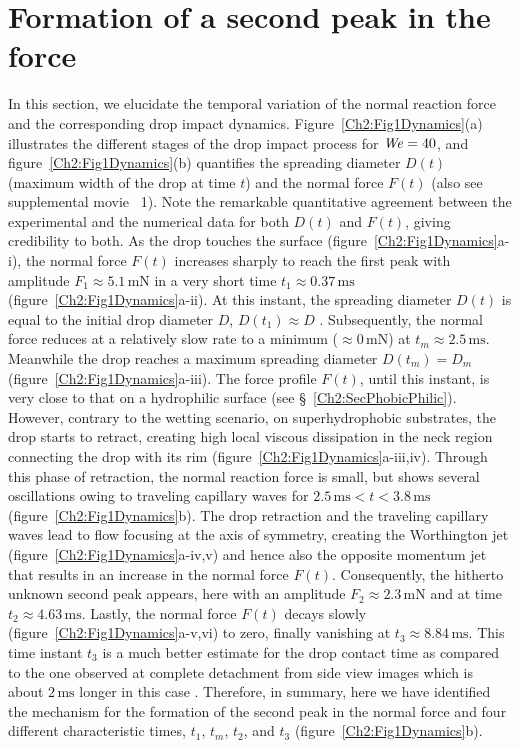 \section{Formation of a second peak in the force}\label{Ch2:SecForceTime}

In this section, we elucidate the temporal variation of the normal reaction force and the corresponding drop impact dynamics. Figure~\ref{Ch2:Fig1Dynamics}(a) illustrates the different stages of the drop impact process for $\mathit{We} = 40$, and figure~\ref{Ch2:Fig1Dynamics}(b) quantifies the spreading diameter $D(t)$ (maximum width of the drop at time $t$) and the normal force $F(t)$ (also see supplemental movie~{\color{Myfig} 1}). Note the remarkable quantitative agreement between the experimental and the numerical data for both $D(t)$ and $F(t)$, giving credibility to both. As the drop touches the surface (figure~\ref{Ch2:Fig1Dynamics}a-i), the normal force $F(t)$ increases sharply to reach the first peak with amplitude $F_1 \approx 5.1\,\si{\milli\newton}$ in a very short time $t_1 \approx 0.37\,\si{\milli\second}$ (figure~\ref{Ch2:Fig1Dynamics}a-ii). At this instant, the spreading diameter $D(t)$ is equal to the initial drop diameter $D$, $D (t_1) \approx D$ \cite{philippi2016, zhang2017, Gordillo2018, mitchell2019, zhang2019}. Subsequently, the normal force reduces at a relatively slow rate to a minimum ($\approx 0\,\si{\milli\newton}$) at $t_m \approx 2.5\,\si{\milli\second}$. Meanwhile the drop reaches a maximum spreading diameter $D(t_m) = D_{m}$  (figure~\ref{Ch2:Fig1Dynamics}a-iii). The force profile $F(t)$, until this instant, is very close to that on a hydrophilic surface (see \S~\ref{Ch2:SecPhobicPhilic}). However, contrary to the wetting scenario, on superhydrophobic substrates, the drop starts to retract, creating high local viscous dissipation in the neck region connecting the drop with its rim (figure~\ref{Ch2:Fig1Dynamics}a-iii,iv). Through this phase of retraction, the normal reaction force is small, but shows several oscillations owing to traveling capillary waves for $2.5\,\si{\milli\second} < t < 3.8\,\si{\milli\second}$ (figure~\ref{Ch2:Fig1Dynamics}b).  The drop retraction and the traveling capillary waves lead to flow focusing at the axis of symmetry, creating the Worthington jet (figure~\ref{Ch2:Fig1Dynamics}a-iv,v) and hence also the opposite momentum jet that results in an increase in the normal force $F(t)$. Consequently, the hitherto unknown second peak appears, here with an amplitude $F_2 \approx 2.3\,\si{\milli\newton}$ and at time $t_2 \approx 4.63\,\si{\milli\second}$. Lastly, the normal force $F(t)$ decays slowly (figure~\ref{Ch2:Fig1Dynamics}a-v,vi) to zero, finally vanishing at $t_3 \approx 8.84\,\si{\milli\second}$. This time instant $t_3$ is a much better estimate for the drop contact time as compared to the one observed at complete detachment from side view images which is about $2\,\si{\milli\second}$ longer in this case \cite{richard2002contact, chantelot_lohse_2021}. Therefore, in summary, here we have identified the mechanism for the formation of the second peak in the normal force and four different characteristic times,  $t_1$, $t_m$, $t_2$, and $t_3$ (figure~\ref{Ch2:Fig1Dynamics}b). 

